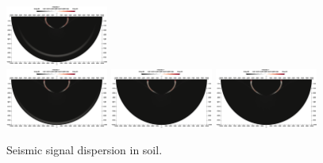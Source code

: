 \begin{figure}
    \includegraphics[width=0.3\textwidth]{./Images/t10-large.png}\\
    \includegraphics[width=0.3\textwidth]{./Images/t11-large.png}        \includegraphics[width=0.3\textwidth]{./Images/t12-large.png}    
    \includegraphics[width=0.3\textwidth]{./Images/t13-large.png}
    \caption{Seismic signal dispersion in soil.}
    \label{fig:soilsemi}
\end{figure}


